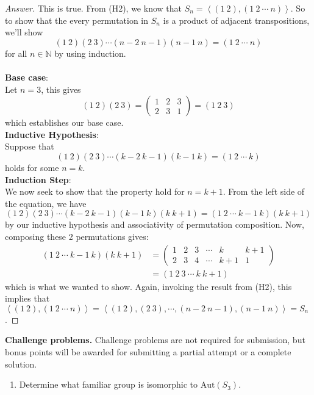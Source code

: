\documentclass{article}
\newcommand{\parens}[1]{\left(#1\right)}
\newcommand{\N}{\mathbb{N}}
\newcommand{\abracks}[1]{\left< #1\right>}
\begin{document}
\begin{enumerate}[(H1)]
\begin{enumerate}[(a)]
\begin{proof}[Answer]
This is true. From (H2), we know that $S_n = \abracks{(1\ 2), 
(1\ 2\ \cdots\ n)}$. So to show that the every permutation in 
$S_n$ is 
a product of adjacent transpositions, we'll show
$$(1\ 2)(2\ 3)\cdots(n-2\ n-1)(n-1\ n) = (1\ 2\ \cdots\ n)$$
for all $n \in \N$ by using induction.\\\\
\textbf{Base case}:\\
Let $n = 3$, this gives
$$(1\ 2)(2\ 3) = \parens{
\begin{matrix}
1 & 2 & 3 \\
2 & 3 & 1
\end{matrix}} = (1\ 2\ 3)
$$
which establishes our base case.\\
\textbf{Inductive Hypothesis}:\\
Suppose that 
$$(1\ 2)(2\ 3)\cdots(k-2\ k-1)(k-1\ k) = (1\ 2\ \cdots\ k)$$
holds for some $n = k$.\\
\textbf{Induction Step}:\\
We now seek to show that the property hold for $n = k+1$. From the left side of the equation, we have
$$(1\ 2)(2\ 3) \cdots (k-2\ k-1)(k-1\ k)(k\ k+1) = (1\ 2\ 
\cdots\ k-1\ k)(k\ k+1)$$
by our inductive hypothesis and associativity of permutation 
composition. Now, composing these 2 permutations gives:
\begin{align*}
(1\ 2\ \cdots\ k-1\ k)(k\ k+1) &= \parens{
\begin{matrix}
1 & 2 & 3 & \cdots & k & k+1 \\
2 & 3 & 4 & \cdots  & k+1& 1
\end{matrix}} \\
&= (1\ 2\ 3\ \cdots\ k\ k+1)
\end{align*} 
which is what we wanted to show. Again, invoking the result from 
(H2), this implies that $\abracks{(1\ 2), (1\ 2\ \cdots\ n)} = 
\abracks{(1\ 2),(2\ 3),\cdots,(n-2\ n-1),(n-1\ n)} = S_n$.
\end{proof}

\end{enumerate}

\end{enumerate}


\bigskip
\noindent
\textbf{Challenge problems.}
Challenge problems are not required for submission, but bonus points will be awarded for submitting a partial attempt or a complete solution.  

\begin{enumerate}[(C1)]
\item 
Determine what familiar group is isomorphic to $\text{Aut}(S_3)$.  

\end{enumerate}
\noindent\makebox[\linewidth]{\rule{\paperwidth}{0.4pt}}
	
\end{document}
